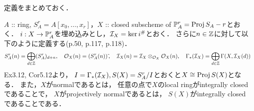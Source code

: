 \documentclass[a4paper]{jsarticle}
\begin{document}
定義をまとめておく．

    $A$ :: ring, $S_A^r=A[x_0,\dots,x_r]$，$X$ :: closed subscheme of $\mathbb{P}^r_A=\operatorname{Proj} S_A-r$とおく．
    $i: X \to \mathbb{P}^r_A$を埋め込みとし，$\mathcal{I}_X=\ker i^{\#}$とおく．
    さらに$n \in \mathbb{Z}$に対して以下のように定義する(p.50, p.117, p.118)．
    \[
        S_A^r(n)=\bigoplus_{d \in \mathbb{Z}} (S_A^r)_{d+n},~~~
        \mathcal{O}_X(n)=(S_A^r(n))\,\tilde{},~~~
        \mathcal{I}_X(n)=\mathcal{I}_X \otimes_{\mathcal{O}_X} \mathcal{O}_X(n),~~~
        \Gamma_*(\mathcal{I}_X)=\bigoplus_{d \in \mathbb{Z}} \Gamma(X,\mathcal{I}_X(d))
    \]
    Ex3.12, Cor5.12より，
    $I=\Gamma_*(\mathcal{I}_X), S(X)=S_A^r/I$とおくと$X \cong \operatorname{Proj} S(X)$となる．
    また，$X$がnormalであるとは，
    任意の点で$X$のlocal ringがintegrally closedであることで，
    $X$がprojectively normalであるとは，
    $S(X)$がintegrally closedであることである．
\end{document}
